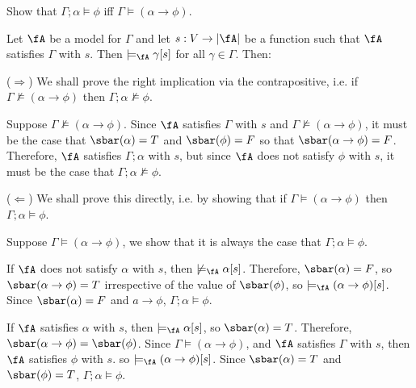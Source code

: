 \begin{problem}[1]
  \begin{enumalph}
    \item Show that $\Gamma ; \alpha \models \phi$ iff $\Gamma \models (\alpha \to \phi)$.
  \end{enumalph}
\end{problem}
\begin{Answer}
  
  \step
  Let $\fA$ be a model for $\Gamma$ and let $s : V \to \abs{\fA}$
  be a function such that $\fA$ satisfies $\Gamma$ with $s$.
  Then $\models_{\fA} \gamma[s]$ for all $\gamma \in \Gamma$.
  Then:

  \step
  ($\Rightarrow$)
  We shall prove the right implication via the contrapositive,
  i.e. if $\Gamma \not \models (\alpha \to \phi)$
  then $\Gamma ; \alpha \not \models \phi$.

  \step
  Suppose $\Gamma \not \models (\alpha \to \phi)$.
  Since $\fA$ satisfies $\Gamma$ with $s$
  and $\Gamma \not \models (\alpha \to \phi)$,
  it must be the case that $\sbar(\alpha) = T$ and $\sbar(\phi) = F$
  so that $\sbar(\alpha \to \phi) = F$.
  Therefore, $\fA$ satisfies $\Gamma ; \alpha$ with $s$,
  but since $\fA$ does not satisfy $\phi$ with $s$,
  it must be the case that $\Gamma ; \alpha \not \models \phi$.
  
  \bigskip
  \bigskip
  \step
    ($\Leftarrow$)
    We shall prove this directly, i.e. by showing that
    if $\Gamma \models (\alpha \to \phi)$ then
    $\Gamma ; \alpha \models \phi$.

    \step
    Suppose $\Gamma \models (\alpha \to \phi)$,
    we show that it is always the case that $\Gamma ; \alpha \models \phi$.
    \begin{enumroman}
      \item If $\fA$ does not satisfy $\alpha$ with $s$, then
        $\not \models_{\fA} \alpha[s]$. Therefore,
        $\sbar(\alpha) = F$, so $\sbar(\alpha \to \phi) = T$
        irrespective of the value of $\sbar(\phi)$,
        so $\models_{\fA} (\alpha \to \phi)[s]$.
        Since $\sbar(\alpha) = F$ and $a \to \phi$,
        $\Gamma ; \alpha \models \phi$.
      \item If $\fA$ satisfies $\alpha$ with $s$, then
        $\models_{\fA} \alpha[s]$, so $\sbar(\alpha) = T$.
        Therefore, $\sbar(\alpha \to \phi) = \sbar(\phi)$.
        Since $\Gamma \models (\alpha \to \phi)$,
        and $\fA$ satisfies $\Gamma$ with $s$,
        then $\fA$ satisfies $\phi$ with $s$.
        so $\models_{\fA} (\alpha \to \phi)[s]$.
        Since $\sbar(\alpha) = T$ and $\sbar(\phi) = T$,
        $\Gamma ; \alpha \models \phi$.
    \end{enumroman}
\end{Answer}
